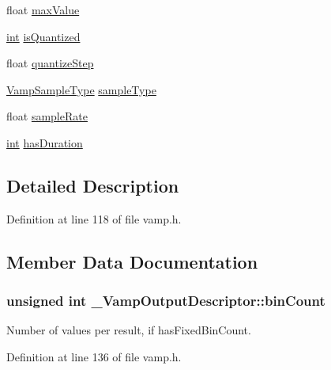 \begin{DoxyCompactItemize}
$$float \hyperlink{struct___vamp_output_descriptor_a4cbe540a247df60f85b00b2aa16461ee}{max\+Value}
\item 
\hyperlink{xmltok_8h_a5a0d4a5641ce434f1d23533f2b2e6653}{int} \hyperlink{struct___vamp_output_descriptor_ab56cf0bbb17136819024574d5cc65e30}{is\+Quantized}
\item 
float \hyperlink{struct___vamp_output_descriptor_a71aa40222dda4321030cccd0bb655fe3}{quantize\+Step}
\item 
\hyperlink{vamp_8h_aa24a8cee023d8b7659d25cbe0584b821}{Vamp\+Sample\+Type} \hyperlink{struct___vamp_output_descriptor_a5da1d27cc99badc214640e859b882072}{sample\+Type}
\item 
float \hyperlink{struct___vamp_output_descriptor_a1ccf193317b2b9c2eb0dbd8dcf61d26e}{sample\+Rate}
\item 
\hyperlink{xmltok_8h_a5a0d4a5641ce434f1d23533f2b2e6653}{int} \hyperlink{struct___vamp_output_descriptor_af792a96dbf292ec966b9b68250febd99}{has\+Duration}
\end{DoxyCompactItemize}


\subsection{Detailed Description}


Definition at line 118 of file vamp.\+h.



\subsection{Member Data Documentation}
\subsubsection[{\texorpdfstring{bin\+Count}{binCount}}]{\setlength{\rightskip}{0pt plus 5cm}unsigned {\bf int} \+\_\+\+Vamp\+Output\+Descriptor\+::bin\+Count}\hypertarget{struct___vamp_output_descriptor_a652ee422092720e44d23d98bdb68f978}{}\label{struct___vamp_output_descriptor_a652ee422092720e44d23d98bdb68f978}
Number of values per result, if has\+Fixed\+Bin\+Count. 

Definition at line 136 of file vamp.\+h.

